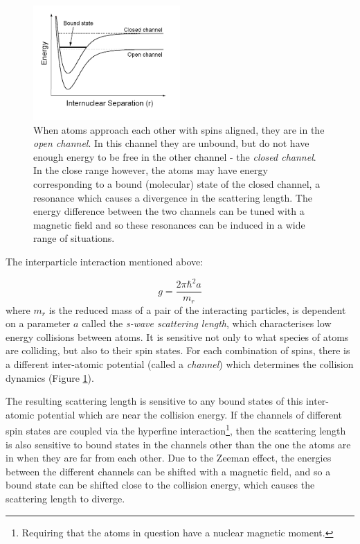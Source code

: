 \begin{figure}%
\begin{center}
\includegraphics[width=0.5\textwidth]{figures/unsorted/feshbach.png}
\caption{When atoms approach each other with spins aligned, they are in the \emph{open channel}. In this channel they are unbound, but do not have enough energy to be free in the other channel - the \emph{closed channel}. In the close range however, the atoms may have energy corresponding to a bound (molecular) state of the closed channel, a resonance which causes a divergence in the scattering length. The energy difference between the two channels can be tuned with a magnetic field and so these resonances can be induced in a wide range of situations.}\label{fig:feshbach}
\end{center}
\end{figure}
The interparticle interaction mentioned above:

\begin{equation}
g = \frac{2\pi \hbar^2 a}{m_r}
\end{equation}
where $m_r$ is the reduced mass of a pair of the interacting particles, is dependent on a parameter $a$ called the \emph{s-wave scattering length}, which characterises low energy collisions between atoms. It is sensitive not only to what species of atoms are colliding, but also to their spin states. For each combination of spins, there is a different inter-atomic potential (called a \emph{channel}) which determines the collision dynamics (Figure \ref{fig:feshbach}).

The resulting scattering length is sensitive to any bound states of this inter-atomic potential which are near the collision energy. If the channels of different spin states are coupled via the hyperfine interaction\footnote{Requiring that the atoms in question have a nuclear magnetic moment.}, then the scattering length is also sensitive to bound states in the channels other than the one the atoms are in when they are far from each other. Due to the Zeeman effect, the energies between the different channels can be shifted with a magnetic field, and so a bound state can be shifted close to the collision energy, which causes the scattering length to diverge.

